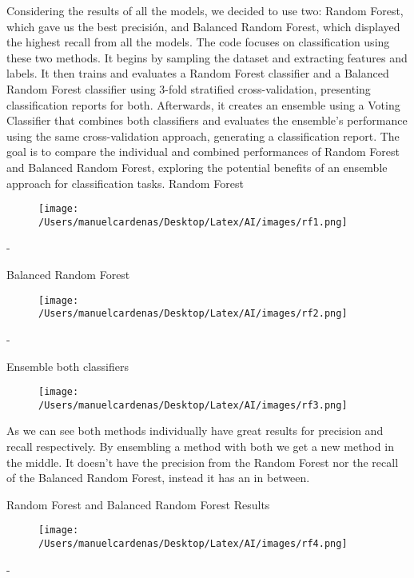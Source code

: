 \documentclass{article}
\begin{document}
    Considering the results of all the models, we decided to use two: Random Forest, which gave us the best precisión, 
    and Balanced Random Forest, which displayed the highest recall from all the models. The code focuses on classification 
    using these two methods. It begins by sampling the dataset and extracting features and labels. It then trains and evaluates 
    a Random Forest classifier and a Balanced Random Forest classifier using 3-fold stratified cross-validation, presenting 
    classification reports for both. Afterwards, it creates an ensemble using a Voting Classifier that combines both classifiers 
    and evaluates the ensemble's performance using the same cross-validation approach, generating a classification report. 
    The goal is to compare the individual and combined performances of Random Forest and Balanced Random Forest, exploring 
    the potential benefits of an ensemble approach for classification tasks.\pagebreak
    Random Forest
    \begin{figure}[h]
        \centering
        \texttt{[image: /Users/manuelcardenas/Desktop/Latex/AI/images/rf1.png]}
        \label{fig:rf1}
    \end{figure}
    - \pagebreak

    Balanced Random Forest
    \begin{figure}[h]
        \centering
        \texttt{[image: /Users/manuelcardenas/Desktop/Latex/AI/images/rf2.png]}
        \label{fig:rf2}
    \end{figure}
    - \pagebreak

    Ensemble both classifiers
    \begin{figure}[h]
        \centering
        \texttt{[image: /Users/manuelcardenas/Desktop/Latex/AI/images/rf3.png]}
        \label{fig:rf3}
    \end{figure}
    
    As we can see both methods individually have great results for precision and recall respectively. 
    By ensembling a method with both we get a new method in the middle. It doesn't have the precision from the Random Forest nor the recall of the Balanced Random Forest, instead it has an in between.\pagebreak

    Random Forest and Balanced Random Forest Results
    \begin{figure}[h]
        \centering
        \texttt{[image: /Users/manuelcardenas/Desktop/Latex/AI/images/rf4.png]}
        \label{fig:rf4}
    \end{figure}
    - \pagebreak
\end{document}
